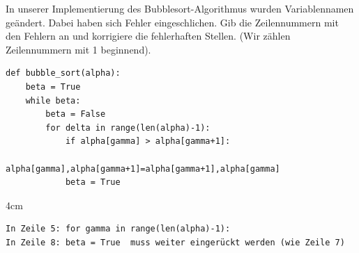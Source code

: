 \question[2]
In unserer Implementierung des Bubblesort-Algorithmus wurden Variablennamen geändert. 
Dabei haben sich Fehler eingeschlichen. Gib die Zeilennummern mit den Fehlern an und korrigiere die fehlerhaften Stellen.
(Wir zählen Zeilennummern mit 1 beginnend).
\begin{lstlisting}
def bubble_sort(alpha):
    beta = True
    while beta:
        beta = False
        for delta in range(len(alpha)-1):
            if alpha[gamma] > alpha[gamma+1]:
                alpha[gamma],alpha[gamma+1]=alpha[gamma+1],alpha[gamma]
            beta = True

\end{lstlisting}
\begin{solutionbox}{4cm}
\begin{lstlisting}
In Zeile 5: for gamma in range(len(alpha)-1):
In Zeile 8: beta = True  muss weiter eingerückt werden (wie Zeile 7)
\end{lstlisting}
\end{solutionbox}
